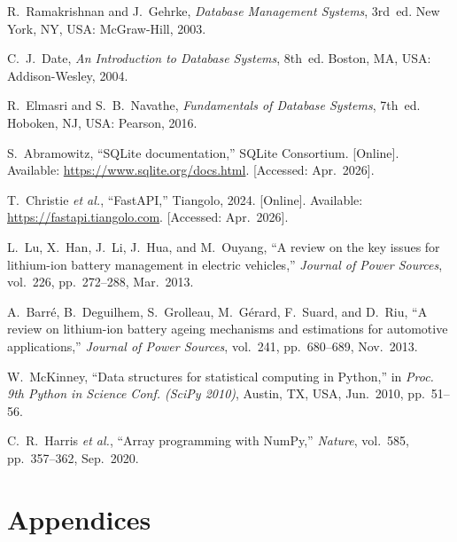 \documentclass[12pt, a4paper]{report}
\begin{document}
\begin{enumerate}[label={[\arabic*]}]

    \item R.~Ramakrishnan and J.~Gehrke, \textit{Database Management Systems}, 3rd~ed. New York, NY, USA: McGraw-Hill, 2003.

    \item C.~J.~Date, \textit{An Introduction to Database Systems}, 8th~ed. Boston, MA, USA: Addison-Wesley, 2004.

    \item R.~Elmasri and S.~B.~Navathe, \textit{Fundamentals of Database Systems}, 7th~ed. Hoboken, NJ, USA: Pearson, 2016.

    \item S.~Abramowitz, ``SQLite documentation,'' SQLite Consortium. [Online]. Available: \url{https://www.sqlite.org/docs.html}. [Accessed: Apr.~2026].

    \item T.~Christie \textit{et al.}, ``FastAPI,'' Tiangolo, 2024. [Online]. Available: \url{https://fastapi.tiangolo.com}. [Accessed: Apr.~2026].

    \item L.~Lu, X.~Han, J.~Li, J.~Hua, and M.~Ouyang, ``A review on the key issues for lithium-ion battery management in electric vehicles,'' \textit{Journal of Power Sources}, vol.~226, pp.~272--288, Mar.~2013.

    \item A.~Barr{\'e}, B.~Deguilhem, S.~Grolleau, M.~G{\'e}rard, F.~Suard, and D.~Riu, ``A review on lithium-ion battery ageing mechanisms and estimations for automotive applications,'' \textit{Journal of Power Sources}, vol.~241, pp.~680--689, Nov.~2013.

    \item W.~McKinney, ``Data structures for statistical computing in Python,'' in \textit{Proc. 9th Python in Science Conf. (SciPy 2010)}, Austin, TX, USA, Jun.~2010, pp.~51--56.

    \item C.~R.~Harris \textit{et al.}, ``Array programming with NumPy,'' \textit{Nature}, vol.~585, pp.~357--362, Sep.~2020.

\end{enumerate}

\newpage

\chapter*{Appendices}
\end{document}

